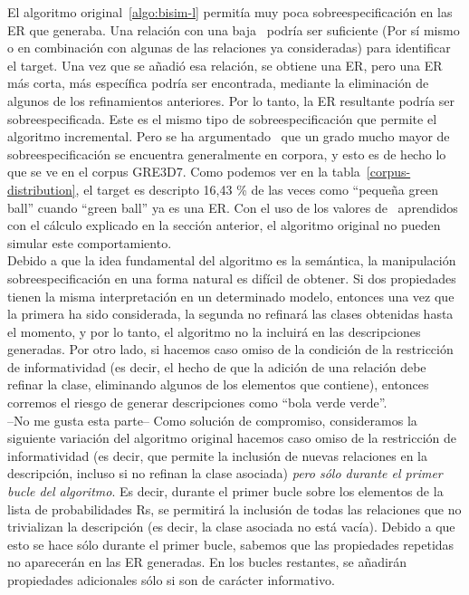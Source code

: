 El algoritmo original~\ref{algo:bisim-l}
 permit\'ia muy poca sobreespecificaci\'on en las ER que
generaba. Una relaci\'on con una baja \puse\ podr\'{i}a ser suficiente
(Por s\'{i} mismo o en combinaci\'on con algunas de las relaciones ya consideradas) para
identificar el target. Una vez que se a\~nadi\'o esa relaci\'on, se obtiene una ER, pero una ER m\'as corta, m\'as espec\'{i}fica podr\'{i}a ser encontrada, mediante la eliminaci\'on de algunos de los refinamientos anteriores.
Por lo tanto, la ER resultante podr\'{i}a ser sobreespecificada. Este es el mismo tipo de sobreespecificaci\'on
que permite el algoritmo incremental. Pero se ha argumentado~\cite{Engelhardt_Bailey_Ferreira_2006, Arts_Maes_Noordman_Jansen_2011} que
un grado mucho mayor de sobreespecificaci\'on se encuentra generalmente en corpora, y esto
es de hecho lo que se ve en el corpus GRE3D7. Como podemos ver en la tabla~\ref{corpus-distribution},
el target es descripto 16,43 \% de las veces como ``peque\~na green ball'' cuando ``green ball'' ya es una ER. Con el uso de los valores de \puse\ aprendidos con el c\'alculo explicado en la secci\'on anterior, el algoritmo original no pueden simular este comportamiento.\\

Debido a que la idea fundamental del algoritmo es la sem\'antica, la manipulaci\'on sobreespecificaci\'on en
una forma natural es dif\'{i}cil de obtener. Si dos propiedades tienen la misma interpretaci\'on en un determinado
modelo, entonces una vez que la primera ha sido considerada, la segunda no refinar\'a las clases
obtenidas hasta el momento, y por lo tanto, el algoritmo no la incluir\'a en las descripciones generadas.
Por otro lado, si hacemos caso omiso de la condici\'on de la restricci\'on de informatividad (es decir,
el hecho de que la adici\'on de una relaci\'on debe refinar la clase, eliminando algunos de
los elementos que contiene), entonces corremos el riesgo de generar descripciones como ``bola verde verde''.\\

--No me gusta esta parte--
Como soluci\'on de compromiso, consideramos la siguiente variaci\'on del algoritmo
original %
hacemos caso omiso de la restricci\'on de informatividad (es decir, que permite la inclusi\'on de nuevas relaciones
en la descripci\'on, incluso si no refinan la clase asociada) \emph{pero s\'olo durante el
primer bucle del algoritmo}. Es decir, durante el primer bucle sobre los elementos de la
lista de probabilidades Rs, se permitir\'a la inclusi\'on de todas las relaciones que no trivializan la
descripci\'on (es decir, la clase asociada no est\'a vac\'{i}a). Debido a que esto se hace s\'olo durante
el primer bucle, sabemos que las propiedades repetidas no aparecer\'an en las ER generadas.
En los bucles restantes, se a\~nadir\'an propiedades adicionales s\'olo si son de car\'acter informativo.\\

